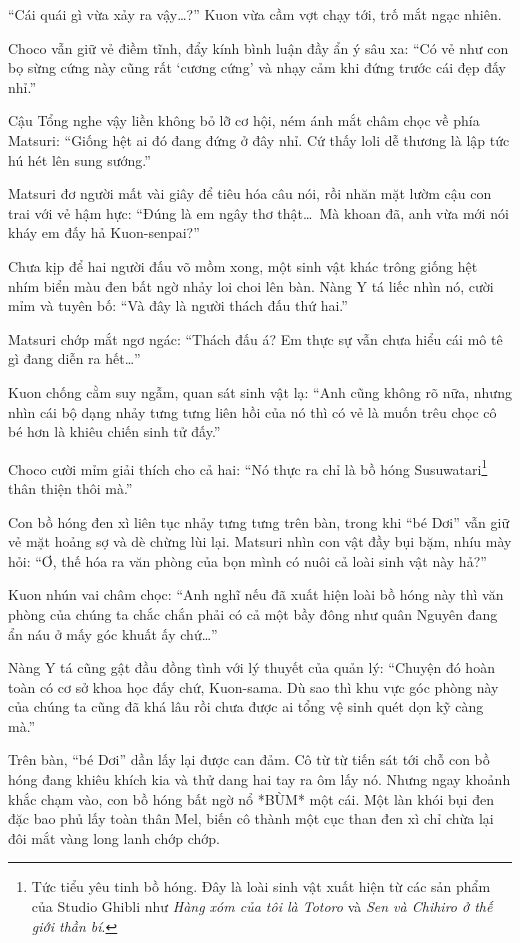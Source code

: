 \documentclass[../main.tex]{subfiles}
\begin{document}
``Cái quái gì vừa xảy ra vậy\dots?'' Kuon vừa cầm vợt chạy tới, trố mắt ngạc nhiên.

Choco vẫn giữ vẻ điềm tĩnh, đẩy kính bình luận đầy ẩn ý sâu xa:
``Có vẻ như con bọ sừng cứng này cũng rất `cương cứng' và nhạy cảm khi đứng trước cái đẹp đấy nhỉ.''

Cậu Tổng nghe vậy liền không bỏ lỡ cơ hội, ném ánh mắt châm chọc về phía Matsuri:
``Giống hệt ai đó đang đứng ở đây nhỉ. Cứ thấy loli dễ thương là lập tức hú hét lên sung sướng.''

Matsuri đơ người mất vài giây để tiêu hóa câu nói, rồi nhăn mặt lườm cậu con trai với vẻ hậm hực:
``Đúng là em ngây thơ thật\dots\ Mà khoan đã, anh vừa mới nói kháy em đấy hả Kuon-senpai?''


Chưa kịp để hai người đấu võ mồm xong, một sinh vật khác trông giống hệt nhím biển màu đen bất ngờ nhảy loi choi lên bàn. Nàng Y tá liếc nhìn nó, cười mỉm và tuyên bố:
``Và đây là người thách đấu thứ hai.''

Matsuri chớp mắt ngơ ngác:
``Thách đấu á? Em thực sự vẫn chưa hiểu cái mô tê gì đang diễn ra hết\dots''

Kuon chống cằm suy ngẫm, quan sát sinh vật lạ:
``Anh cũng không rõ nữa, nhưng nhìn cái bộ dạng nhảy tưng tưng liên hồi của nó thì có vẻ là muốn trêu chọc cô bé hơn là khiêu chiến sinh tử đấy.''

Choco cười mỉm giải thích cho cả hai:
``Nó thực ra chỉ là bồ hóng Susuwatari\footnote{Tức tiểu yêu tinh bồ hóng. Đây là loài sinh vật xuất hiện từ các sản phẩm của Studio Ghibli như \textit{Hàng xóm của tôi là Totoro} và \textit{Sen và Chihiro ở thế giới thần bí}.} thân thiện thôi mà.''

Con bồ hóng đen xì liên tục nhảy tưng tưng trên bàn, trong khi ``bé Dơi'' vẫn giữ vẻ mặt hoảng sợ và dè chừng lùi lại. Matsuri nhìn con vật đầy bụi bặm, nhíu mày hỏi:
``Ơ, thế hóa ra văn phòng của bọn mình có nuôi cả loài sinh vật này hả?''

Kuon nhún vai châm chọc:
``Anh nghĩ nếu đã xuất hiện loài bồ hóng này thì văn phòng của chúng ta chắc chắn phải có cả một bầy đông như quân Nguyên đang ẩn náu ở mấy góc khuất ấy chứ\dots''

Nàng Y tá cũng gật đầu đồng tình với lý thuyết của quản lý:
``Chuyện đó hoàn toàn có cơ sở khoa học đấy chứ, Kuon-sama. Dù sao thì khu vực góc phòng này của chúng ta cũng đã khá lâu rồi chưa được ai tổng vệ sinh quét dọn kỹ càng mà.''

Trên bàn, ``bé Dơi'' dần lấy lại được can đảm. Cô từ từ tiến sát tới chỗ con bồ hóng đang khiêu khích kia và thử dang hai tay ra ôm lấy nó. Nhưng ngay khoảnh khắc chạm vào, con bồ hóng bất ngờ nổ *BÙM* một cái. Một làn khói bụi đen đặc bao phủ lấy toàn thân Mel, biến cô thành một cục than đen xì chỉ chừa lại đôi mắt vàng long lanh chớp chớp.
\end{document}
